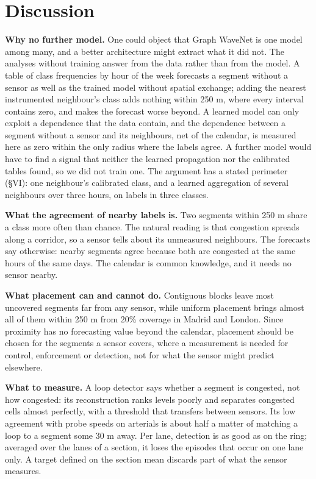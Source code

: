 \section{Discussion}
\textbf{Why no further model.} One could object that Graph WaveNet is one model among many, and a better architecture might extract what it did not. The analyses without training answer from the data rather than from the model. A table of class frequencies by hour of the week forecasts a segment without a sensor as well as the trained model without spatial exchange; adding the nearest instrumented neighbour's class adds nothing within 250 m, where every interval contains zero, and makes the forecast worse beyond. A learned model can only exploit a dependence that the data contain, and the dependence between a segment without a sensor and its neighbours, net of the calendar, is measured here as zero within the only radius where the labels agree. A further model would have to find a signal that neither the learned propagation nor the calibrated tables found, so we did not train one. The argument has a stated perimeter (§VI): one neighbour's calibrated class, and a learned aggregation of several neighbours over three hours, on labels in three classes.

\textbf{What the agreement of nearby labels is.} Two segments within 250 m share a class more often than chance. The natural reading is that congestion spreads along a corridor, so a sensor tells about its unmeasured neighbours. The forecasts say otherwise: nearby segments agree because both are congested at the same hours of the same days. The calendar is common knowledge, and it needs no sensor nearby.

\textbf{What placement can and cannot do.} Contiguous blocks leave most uncovered segments far from any sensor, while uniform placement brings almost all of them within 250 m from 20\% coverage in Madrid and London. Since proximity has no forecasting value beyond the calendar, placement should be chosen for the segments a sensor covers, where a measurement is needed for control, enforcement or detection, not for what the sensor might predict elsewhere.

\textbf{What to measure.} A loop detector says whether a segment is congested, not how congested: its reconstruction ranks levels poorly and separates congested cells almost perfectly, with a threshold that transfers between sensors. Its low agreement with probe speeds on arterials is about half a matter of matching a loop to a segment some 30 m away. Per lane, detection is as good as on the ring; averaged over the lanes of a section, it loses the episodes that occur on one lane only. A target defined on the section mean discards part of what the sensor measures.


